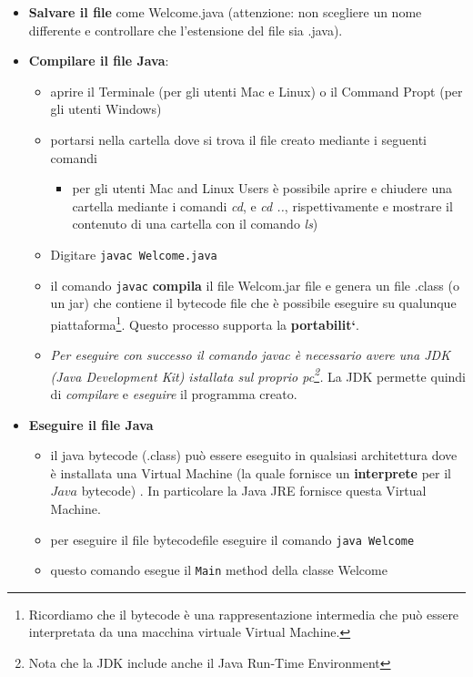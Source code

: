 \documentclass{article}
\theoremstyle{definition}
\begin{document}
\begin{itemize}
\item \textbf{Salvare il file} come Welcome.java (attenzione: non scegliere un nome differente e controllare che l'estensione del file sia .java).
\end{itemize}

\begin{itemize}
\item \textbf{Compilare il file Java}:
\begin{itemize}
\item aprire il Terminale (per gli utenti Mac e Linux) o il Command Propt (per gli utenti Windows)
\item portarsi nella cartella dove si trova il file creato mediante i seguenti comandi
\begin{itemize}
\item per gli utenti  Mac and Linux Users \`e possibile aprire e chiudere una cartella mediante i comandi \emph{cd}, e \emph{cd ..}, rispettivamente e mostrare il contenuto di una cartella con il comando \emph{ls}) 
\end{itemize}
\item Digitare \texttt{javac Welcome.java}
\item il comando \texttt{javac}  \textbf{compila} il file Welcom.jar file e genera un file .class (o un jar) che contiene il bytecode file che \`e possibile eseguire su qualunque piattaforma\footnote{Ricordiamo che il bytecode \`e una rappresentazione intermedia che pu\`o essere interpretata da una macchina virtuale Virtual Machine.}. Questo processo supporta la  \textbf{portabilit\a`}. 
\item \emph{Per eseguire con successo il comando \emph{javac} \`e necessario avere una JDK (Java Development Kit) istallata sul proprio pc\footnote{Nota che la JDK include anche il Java Run-Time Environment}.} La JDK permette quindi di  \emph{compilare} e \emph{eseguire} il programma creato.
\end{itemize}
\end{itemize}

\begin{itemize}
\item \textbf{Eseguire il file Java}
\begin{itemize}
\item il java bytecode (.class) pu\`o essere eseguito in qualsiasi architettura dove \`e installata una Virtual Machine (la quale fornisce un  \textbf{interprete} per il $Java$ bytecode) . In particolare la Java JRE fornisce questa Virtual Machine.
\item per eseguire il file bytecodefile eseguire il comando \texttt{java Welcome}
\item questo comando esegue il   \texttt{Main} method della classe Welcome
\end{itemize}
\end{itemize}
\end{document}
